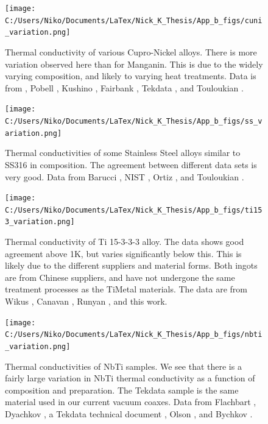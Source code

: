 \documentclass{report}
\begin{document}
\begin{appendices}
\begin{figure}[h]
\centering
\texttt{[image: C:/Users/Niko/Documents/LaTex/Nick\_K\_Thesis/App\_b\_figs/cuni\_variation.png]}
\caption{Thermal conductivity of various Cupro-Nickel alloys. There is more variation observed here than for Manganin. This is due to the widely varying composition, and likely to varying heat treatments. Data is from \cite{ols}, Pobell \cite{pob}, Kushino \cite{kus:cu}, Fairbank \cite{fair}, Tekdata \cite{Blake}, and Touloukian \cite{tou}. }
\end{figure}

\begin{figure}[h]
\centering
\texttt{[image: C:/Users/Niko/Documents/LaTex/Nick\_K\_Thesis/App\_b\_figs/ss\_variation.png]}
\caption{Thermal conductivities of some Stainless Steel alloys similar to SS316 in composition. The agreement between different data sets is very good. Data from Barucci \cite{Barucci2008}, NIST \cite{ss316_nist}, Ortiz \cite{Ortiz}, and Touloukian \cite{tou}.}
\end{figure}

\begin{figure}[h]
\centering
\texttt{[image: C:/Users/Niko/Documents/LaTex/Nick\_K\_Thesis/App\_b\_figs/ti153\_variation.png]}
\caption{Thermal conductivity of Ti 15-3-3-3 alloy. The data shows good agreement above 1K, but varies significantly below this. This is likely due to the different suppliers and material forms. Both ingots are from Chinese suppliers, and have not undergone the same treatment processes as the TiMetal materials. The data are from Wikus \cite{wik}, Canavan \cite{Canavan2006}, Runyan \cite{Run_ti153}, and this work. }
\end{figure}

\begin{figure}[h]
\centering
\texttt{[image: C:/Users/Niko/Documents/LaTex/Nick\_K\_Thesis/App\_b\_figs/nbti\_variation.png]}
\caption{Thermal conductivities of NbTi samples. We see that there is a fairly large variation in NbTi thermal conductivity as a function of composition and preparation. The Tekdata sample is the same material used in our current vacuum coaxes. Data from Flachbart \cite{Flachbart1978}, Dyachkov \cite{dya}, a Tekdata technical document \cite{Blake}, Olson \cite{ols}, and Bychkov \cite{byc}.}
\end{figure}



\end{appendices}
\end{document}

